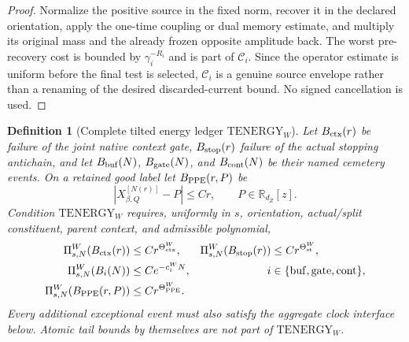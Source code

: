 \documentclass[11pt]{article}
\newtheorem{definition}[theorem]{Definition}
\begin{document}
\begin{proof}
Normalize the positive source in the fixed norm, recover it in the declared
orientation, apply the one-time coupling or dual memory estimate, and
multiply its original mass and the already frozen opposite amplitude back.
The worst pre-recovery cost is bounded by $\gamma_i^{-R_i}$ and is part of
$\mathcal C_i$.  Since the operator estimate is uniform before the final
test is selected, $\mathcal C_i$ is a genuine source envelope rather than a
renaming of the desired discarded-current bound.  No signed cancellation is
used.
\end{proof}

\begin{definition}[Complete tilted energy ledger
$\mathrm{TENERGY}_{W}$]
\label{def:tilted-energy-ledger}
Let $B_{\rm ctx}(r)$ be failure of the joint native context gate,
$B_{\rm stop}(r)$ failure of the actual stopping antichain, and let
$B_{\rm buf}(N)$, $B_{\rm gate}(N)$, and $B_{\rm cont}(N)$ be their named
cemetery events.  On a retained good label let $B_{\rm PPE}(r,P)$ be
\[
 |X^{[N(r)]}_{\beta,Q}-P|\le Cr,
 \qquad P\in\mathbb R_{d_Z}[z].
\]
Condition $\mathrm{TENERGY}_{W}$ requires, uniformly in $s$, orientation,
actual/split constituent, parent context, and admissible polynomial,
\begin{align}
 \Pi_{s,N}^{W}(B_{\rm ctx}(r))&\le Cr^{\Theta_{\rm ctx}^{W}},&
 \Pi_{s,N}^{W}(B_{\rm stop}(r))&\le Cr^{\Theta_{\rm st}^{W}},
 \label{eq:tilted-context-stop-tails}\\
 \Pi_{s,N}^{W}(B_i(N))&\le Ce^{-c_i^{W}N},
 &i&\in\{\mathrm{buf},\mathrm{gate},\mathrm{cont}\},
 \label{eq:tilted-auxiliary-tails}\\
 \Pi_{s,N}^{W}(B_{\rm PPE}(r,P))&\le Cr^{\Theta_{\rm PPE}^{W}}.
 \label{eq:tilted-PPE-tail}
\end{align}
Every additional exceptional event must also satisfy the aggregate clock
interface below.  Atomic tail bounds by themselves are not part of
$\mathrm{TENERGY}_{W}$.
\end{definition}
\end{document}
